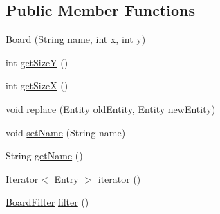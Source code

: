 \subsection*{Public Member Functions}
\begin{DoxyCompactItemize}
\item 
\hyperlink{classjdungeon_1_1core_1_1world_1_1_board_aceeb90dc311bb2163b609733949da0a2}{Board} (String name, int x, int y)
\item 
int \hyperlink{classjdungeon_1_1core_1_1world_1_1_board_a2e91cfc5861d79749898dc61b958d4d6}{getSizeY} ()
\item 
int \hyperlink{classjdungeon_1_1core_1_1world_1_1_board_a661608a34438140c39ebeedf888a11ff}{getSizeX} ()
\item 
void \hyperlink{classjdungeon_1_1core_1_1world_1_1_board_a047b0ef20faff398e51e85d1b6059cbd}{replace} (\hyperlink{classjdungeon_1_1core_1_1world_1_1_entity}{Entity} oldEntity, \hyperlink{classjdungeon_1_1core_1_1world_1_1_entity}{Entity} newEntity)
\item 
void \hyperlink{classjdungeon_1_1core_1_1world_1_1_board_abbffec68bb323c3596ee6da3f1bd104f}{setName} (String name)
\item 
String \hyperlink{classjdungeon_1_1core_1_1world_1_1_board_a78a0c7cb40b2b492a4cfb0bc3a6a1a68}{getName} ()
\item 
Iterator$<$ \hyperlink{classjdungeon_1_1core_1_1world_1_1filter_1_1_entry}{Entry} $>$ \hyperlink{classjdungeon_1_1core_1_1world_1_1_board_a49dc69ece7ed182b3ed9c580ceea71c2}{iterator} ()
\item 
\hyperlink{classjdungeon_1_1core_1_1world_1_1filter_1_1_board_filter}{BoardFilter} \hyperlink{classjdungeon_1_1core_1_1world_1_1_board_ad1cf12a52a7bf6f802e41fa82947d9c1}{filter} ()
\end{DoxyCompactItemize}

